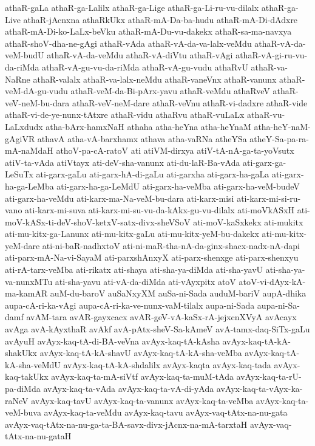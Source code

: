 {athaR-gaLa
athaR-ga-Lalilx
athaR-ga-Lige
athaR-ga-Li-ru-vu-dilalx
athaR-ga-Live
athaR-jAcnxna
athaRkUkx
athaR-mA-Da-ba-hudu
athaR-mA-Di-dAdxre
athaR-mA-Di-ko-LaLx-beVku
athaR-mA-Du-vu-dakekx
athaR-sa-ma-navxya
athaR-shoV-dha-ne-gAgi
athaR-vAda
athaR-vA-da-va-lalx-veMdu
athaR-vA-da-veM-budU
athaR-vA-da-veMdu
athaR-vA-diVtu
athaR-vAgi
athaR-vA-gi-ru-vu-da-riMda
athaR-vA-gu-vu-da-riMda
athaR-vA-gu-vudu
athaRvU
athaR-va-NaRne
athaR-valalx
athaR-va-lalx-neMdu
athaR-vaneVnx
athaR-vanunx
athaR-veM-dA-gu-vudu
athaR-veM-da-Bi-pArx-yavu
athaR-veMdu
athaRveV
athaR-veV-neM-bu-dara
athaR-veV-neM-dare
athaR-veVnu
athaR-vi-dadxre
athaR-vide
athaR-vi-de-ye-nunx-tAtxre
athaR-vidu
athaRvu
athaR-vuLaLx
athaR-vu-LaLxdudx
atha-bArx-hamxNaH
athaha
atha-heYna
atha-heYnaM
atha-heY-naM-gAgiVR
athavA
atha-vA-barxhamx
athava
atha-vaRNa
atheYSa
atheY-Sa-pa-ra-mA-naMdaH
athoV-pa-cA-ratoV
ati
atiVM-dirxya
atiV-tA-nA-ga-ta-yoVsutx
atiV-ta-vAda
atiVtayx
ati-deV-sha-vanunx
ati-du-laR-Ba-vAda
ati-garx-ga-LeSuTx
ati-garx-gaLu
ati-garx-hA-di-gaLu
ati-garxha
ati-garx-ha-gaLa
ati-garx-ha-ga-LeMba
ati-garx-ha-ga-LeMdU
ati-garx-ha-veMba
ati-garx-ha-veM-budeV
ati-garx-ha-veMdu
ati-karx-ma-Na-veM-bu-dara
ati-karx-misi
ati-karx-mi-si-ru-vano
ati-karx-mi-suva
ati-karx-mi-su-vu-da-kAkx-gu-vu-dilalx
ati-moVkASxH
ati-moV-kASx-ti-deV-shoV-ketxV-satx-divx-sheVSoV
ati-moV-kaSxkekx
ati-mukitx
ati-mu-kitx-ga-Lanunx
ati-mu-kitx-gaLu
ati-mu-kitx-yeM-bu-dakekx
ati-mu-kitx-yeM-dare
ati-ni-baR-nadhxtoV
ati-ni-maR-tha-nA-da-ginx-shacx-nadx-nA-dapi
ati-parx-mA-Na-vi-SayaM
ati-parxshAnxyX
ati-parx-shenxge
ati-parx-shenxyu
ati-rA-tarx-veMba
ati-rikatx
ati-shaya
ati-sha-ya-diMda
ati-sha-yavU
ati-sha-ya-va-nunxMTu
ati-sha-yavu
ati-vA-da-diMda
ati-vAyxpitx
atoV
atoV-vi-dAyx-kA-ma-kamAR
auM-du-baroV
auSaNxyXM
auSa-ni-Sada
auduM-bariV
aupA-dhika
aupa-cA-ri-ka-vAgi
aupa-cA-ri-ka-ve-nunx-vaM-tilalx
aupa-ni-Sada
aupa-ni-Sa-damf
avAM-tara
avAR-gayxcacx
avAR-geV-vA-kaSx-rA-jejxcnXVyA
avAcayx
avAga
avA-kAyxthaR
avAkf
avA-pAtx-sheV-Sa-kAmeV
avA-tamx-daq-SiTx-gaLu
avAyuH
avAyx-kaq-tA-di-BA-veVna
avAyx-kaq-tA-kAsha
avAyx-kaq-tA-kA-shakUkx
avAyx-kaq-tA-kA-shavU
avAyx-kaq-tA-kA-sha-veMba
avAyx-kaq-tA-kA-sha-veMdU
avAyx-kaq-tA-kA-shdalilx
avAyx-kaqta
avAyx-kaq-tada
avAyx-kaq-takUkx
avAyx-kaq-ta-mA-siVtf
avAyx-kaq-ta-muM-tAda
avAyx-kaq-ta-rU-pa-diMda
avAyx-kaq-ta-vAda
avAyx-kaq-ta-vA-di-yAda
avAyx-kaq-ta-vAyx-ka-raNeV
avAyx-kaq-tavU
avAyx-kaq-ta-vanunx
avAyx-kaq-ta-veMba
avAyx-kaq-ta-veM-buva
avAyx-kaq-ta-veMdu
avAyx-kaq-tavu
avAyx-vaq-tAtx-na-nu-gata
avAyx-vaq-tAtx-na-nu-ga-ta-BA-savx-divx-jAcnx-na-mA-tarxtaH
avAyx-vaq-tAtx-na-nu-gataH
}
